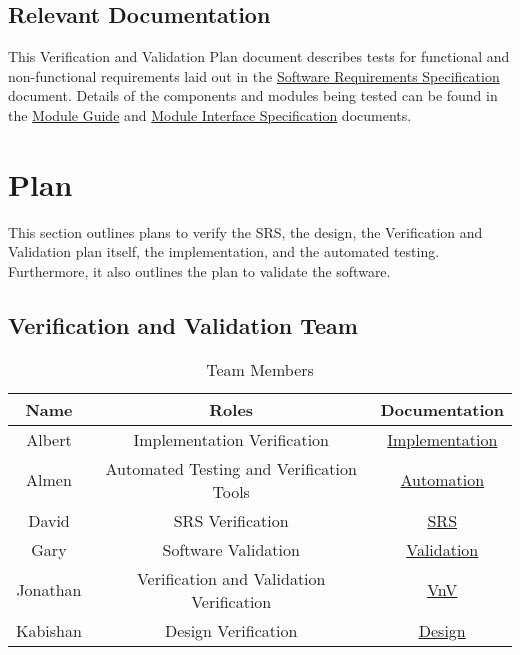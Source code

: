 \documentclass[12pt, titlepage]{article}
\begin{document}
\subsection{Relevant Documentation}


This Verification and Validation Plan document describes tests for functional
and non-functional requirements laid out in the
\href{https://github.com/parkd-app/park-d/blob/main/docs/SRS/SRS.pdf}{Software
Requirements Specification} document. Details of the components and modules
being tested can be found in the
\href{https://github.com/parkd-app/park-d/blob/main/docs/Design/MG/MG.pdf}{Module
Guide} and
\href{https://github.com/parkd-app/park-d/blob/main/docs/Design/MIS/MIS.pdf}{Module
Interface Specification} documents.

\section{Plan}
This section outlines plans to verify the SRS, the design, the Verification and
Validation plan itself, the implementation, and the automated testing.
Furthermore, it also outlines the plan to validate the software. 


\subsection{Verification and Validation Team}
\begin{table}[hp]
\centering
\begin{tabular}{|c|c|c|}
\hline
\textbf{Name} & \textbf{Roles} & \textbf{Documentation}\\
\hline
Albert & Implementation Verification &
\hyperref[sec:implementation]{Implementation}\\
Almen & Automated Testing and Verification Tools &
\hyperref[sec:automation]{Automation}\\
David & SRS Verification & \hyperref[sec:srs]{SRS}\\
Gary & Software Validation & \hyperref[sec:validation]{Validation}\\
Jonathan & Verification and Validation Verification & \hyperref[sec:vnv]{VnV}\\
Kabishan & Design Verification & \hyperref[sec:design]{Design}\\
\hline
\end{tabular}
\caption{Team Members}
\end{table}
\end{document}
